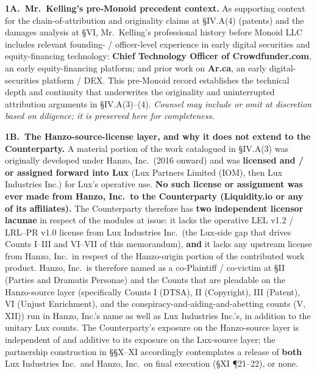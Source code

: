 \documentclass[11pt,letterpaper]{article}
\begin{document}
\textbf{1A.\ Mr.\ Kelling's pre-Monoid precedent context.} As
supporting context for the chain-of-attribution and originality
claims at \S IV.A(4) (patents) and the damages analysis at \S VI,
Mr.\ Kelling's professional history before Monoid LLC includes
relevant founding- / officer-level experience in early digital
securities and equity-financing technology: \textbf{Chief Technology
Officer of Crowdfunder.com}, an early equity-financing platform; and
prior work on \textbf{Ar.ca}, an early digital-securities platform /
DEX. This pre-Monoid record establishes the technical depth and
continuity that underwrites the originality and uninterrupted
attribution arguments in \S IV.A(3)--(4). \textit{Counsel may include
or omit at discretion based on diligence; it is preserved here for
completeness.}

\textbf{1B.\ The Hanzo-source-license layer, and why it does not
extend to the Counterparty.} A material portion of the work
catalogued in \S IV.A(3) was originally developed under Hanzo, Inc.\
(2016 onward) and was \textbf{licensed and / or assigned forward
into Lux} (Lux Partners Limited (IOM), then Lux Industries Inc.) for
Lux's operative use. \textbf{No such license or assignment was ever
made from Hanzo, Inc.\ to the Counterparty (Liquidity.io or any of
its affiliates).} The Counterparty therefore has \textbf{two
independent licensor lacunae} in respect of the modules at issue: it
lacks the operative LEL v1.2 / LRL--PR v1.0 license from Lux
Industries Inc.\ (the Lux-side gap that drives Counts I--III and
VI--VII of this memorandum), \textbf{and} it lacks any upstream
license from Hanzo, Inc.\ in respect of the Hanzo-origin portion of
the contributed work product. Hanzo, Inc.\ is therefore named as a
co-Plaintiff / co-victim at \S II (Parties and Dramatis Personae)
and the Counts that are pleadable on the Hanzo-source layer
(specifically Counts I (DTSA), II (Copyright), III (Patent), VI
(Unjust Enrichment), and the conspiracy-and-aiding-and-abetting
counts (V, XII)) run in Hanzo, Inc.'s name as well as Lux
Industries Inc.'s, in addition to the unitary Lux counts. The
Counterparty's exposure on the Hanzo-source layer is independent of
and additive to its exposure on the Lux-source layer; the
partnership construction in \S\S X--XI accordingly contemplates a
release of \textbf{both} Lux Industries Inc.\ and Hanzo, Inc.\ on
final execution (\S XI ¶21--22), or none.
\end{document}
